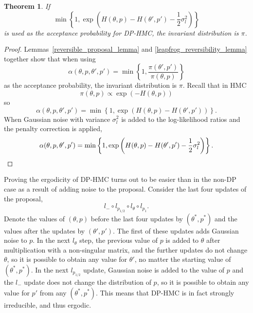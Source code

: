 \documentclass[english,twoside,openright]{HYgraduMLDS}
\newtheorem{theorem}{Theorem}
\begin{document}
\begin{theorem}
  If
  \[
    \min\left\{1, \exp\left(H(\theta, p)
        - H(\theta', p') - \frac{1}{2}\sigma_{l}^{2}\right)\right\}
  \]
  is used as the acceptance probability for DP-HMC, the invariant distribution
  is \(\pi\).
\end{theorem}
\begin{proof}
Lemmas~\ref{reversible_proposal_lemma} and \ref{leapfrog_reversibility_lemma}
together show that when using
\[
  \alpha(\theta, p, \theta', p')
  = \min\left\{1, \frac{\pi(\theta', p')}{\pi(\theta, p)}\right\}
\]
as the acceptance probability, the invariant distribution is \(\pi\).
Recall that in HMC
\[
  \pi(\theta, p) \propto \exp(-H(\theta, p))
\]
so
\[
  \alpha(\theta, p, \theta', p')
  = \min\left\{1, \exp\left(H(\theta, p) - H(\theta', p')\right)\right\}.
\]
When Gaussian noise with variance \(\sigma_{l}^{2}\) is added to the
log-likelihood ratios and the penalty correction is applied,
  \[
    \alpha(\theta, p, \theta', p')
    = \min\left\{1, \exp\left(H(\theta, p)
        - H(\theta', p') - \frac{1}{2}\sigma_{l}^{2}\right)\right\}.
    \qedhere
  \]
\end{proof}

Proving the ergodicity of DP-HMC turns out to be easier than in the
non-DP case as a result of adding noise to the proposal. Consider the
last four updates of the proposal,
\[
  l_{-}\circ l_{p_{1/2}}\circ l_{\theta}\circ l_{p_{1}}.
\]
Denote the values of \((\theta, p)\) before the last four updates by \((\theta^{*}, p^{*})\) and
the values after the updates by \((\theta', p')\).
The first of these updates adds Gaussian noise to \(p\). In the next
\(l_{\theta}\) step, the previous value of \(p\) is added to \(\theta\)
after multiplication with a non-singular matrix, and the further updates
do not change \(\theta\), so it is possible
to obtain any value for \(\theta'\), no matter the starting value of
\((\theta^{*}, p^{*})\). In the next \(l_{p_{1/2}}\) update, Gaussian noise is
added to the value of \(p\) and the \(l_{-}\) update does not change the distribution
of \(p\), so it is possible to obtain any value
for \(p'\) from any \((\theta^{*}, p^{*})\). This means that
DP-HMC is in fact strongly irreducible, and thus ergodic.
\end{document}
